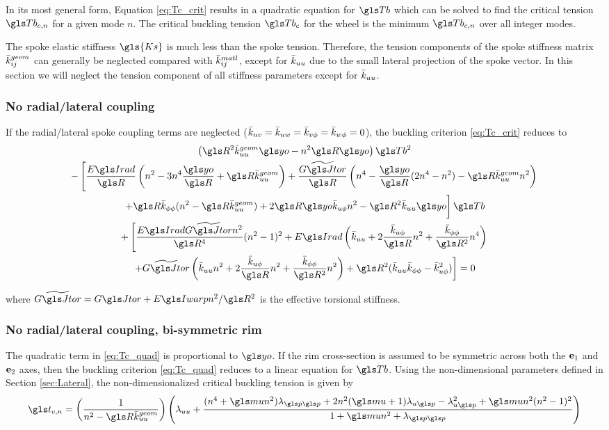 \documentclass[\rootdir/thesis.tex]{subfiles}
\begin{document}
In its most general form, Equation \eqref{eq:Tc_crit} results in a quadratic equation for $\Tb$ which can be solved to find the critical tension $\Tb_{c,n}$ for a given mode $n$. The critical buckling tension $\Tb_c$ for the wheel is the minimum $\Tb_{c,n}$ over all integer modes.

The spoke elastic stiffness $\gls{Ks}$ is much less than the spoke tension. Therefore, the tension components of the spoke stiffness matrix $\bar{k}_{ij}^{geom}$ can generally be neglected compared with $\bar{k}_{ij}^{matl}$, except for $\bar{k}_{uu}$ due to the small lateral projection of the spoke vector. In this section we will neglect the tension component of all stiffness parameters except for $\bar{k}_{uu}$.

\subsubsection*{No radial/lateral coupling}
If the radial/lateral spoke coupling terms are neglected ($\bar{k}_{uv}=\bar{k}_{uw}=\bar{k}_{v\phi}=\bar{k}_{w\phi}=0$), the buckling criterion \eqref{eq:Tc_crit} reduces to
\begin{multline}
\label{eq:Tc_quad}
\left(\R^2\geom{\kuu}\yo - n^2\R\yo \right)\Tb^2\\
-\left[\frac{\EIr}{\R}\left(n^2 - 3n^4 \frac{\yo}{\R} + \R\geom{\kuu}\right)
       +\frac{\widetilde{\GJ}}{\R}\left(n^4 - \frac{\yo}{\R}(2n^4 - n^2) - \R\geom{\kuu}n^2\right) \right.\\
       \left. +\R\kpp (n^2 - \R\geom{\kuu}) + 2\R\yo\kup n^2 - \R^2\kuu \yo \vphantom{\frac12} \right]\Tb\\
+\left[\frac{\EIr \widetilde{\GJ} n^2}{\R^4}(n^2-1)^2
       +\EIr\left(\kuu + 2\frac{\kup}{\R}n^2 + \frac{\kpp}{\R^2}n^4\right) \right.\\
       \left. +\widetilde{\GJ}\left(\kuu n^2 + 2\frac{\kup}{\R}n^2 + \frac{\kpp}{\R^2}n^2\right)
       +\R^2(\kuu\kpp - \kup^2)\right] = 0
\end{multline}

where $\widetilde{\GJ} = \GJ + \EIw n^2/\R^2$ is the effective torsional stiffness.

\subsubsection*{No radial/lateral coupling, bi-symmetric rim}
The quadratic term in \eqref{eq:Tc_quad} is proportional to $\yo$. If the rim cross-section is assumed to be symmetric across both the $\mathbf{e}_1$ and $\mathbf{e}_2$ axes, then the buckling criterion \eqref{eq:Tc_quad} reduces to a linear equation for $\Tb$. Using the non-dimensional parameters defined in Section \ref{sec:Lateral}, the non-dimensionalized critical buckling tension is given by
\begin{equation}
\label{eq:Tcn_lin}
\ts_{c,n} = \left(\frac{1}{n^2 - \R\geom{\kuu}}\right)
\left(\lr_{uu}
      +\frac{(n^4 + \m n^2)\lr_{\p\p}
             +2n^2(\m + 1)\lr_{u\p} - \lr_{u\p}^2
             +\m n^2(n^2-1)^2}
        {1 + \m n^2 + \lr_{\p\p}}\right)
\end{equation}
\end{document}
